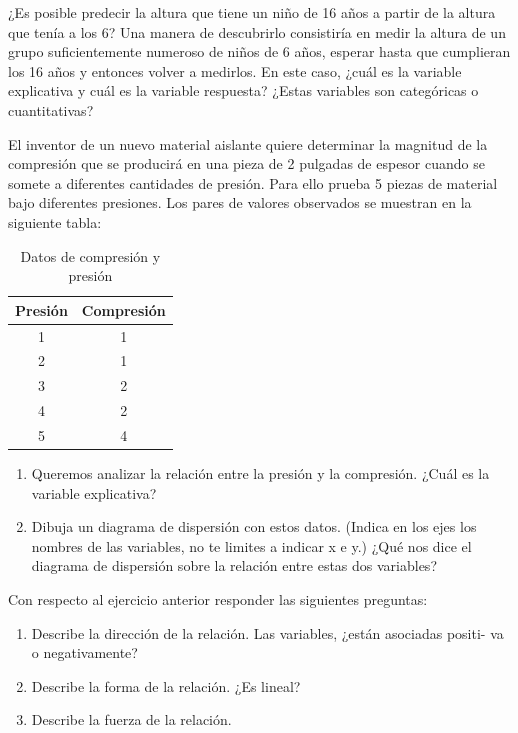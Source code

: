 \documentclass[11pt,evaluacion]{uescimat}
\begin{document}
\begin{problema}
¿Es posible predecir la altura que tiene un niño de 16 años a partir de la altura que tenía a los 6? Una manera de descubrirlo consistiría en medir la altura
de un grupo suficientemente numeroso de niños de 6 años, esperar hasta que
cumplieran los 16 años y entonces volver a medirlos. En este caso, ¿cuál es la variable explicativa y cuál es la variable respuesta? ¿Estas variables son categóricas
o cuantitativas?
\end{problema}

\begin{problema}
El inventor de un nuevo material aislante quiere determinar
la magnitud de la compresión que se producirá en una pieza de 2 pulgadas
de espesor cuando se somete a diferentes cantidades de presión. Para ello
prueba 5 piezas de material bajo diferentes presiones. Los pares de valores
observados se muestran en la siguiente tabla:


\begin{table}[H]
\begin{centering}
\begin{tabular}{|c|c|}
\hline 
Presión & Compresión\tabularnewline
\hline 
\hline 
1 & 1\tabularnewline
\hline 
2 & 1\tabularnewline
\hline 
3 & 2\tabularnewline
\hline 
4 & 2\tabularnewline
\hline 
5 & 4\tabularnewline
\hline 
\end{tabular}
\par\end{centering}
\caption{Datos de compresión y presión}
\end{table}

\begin{enumerate}[label=(\alph*)]
\item Queremos analizar la relación entre la presión y la compresión. ¿Cuál es la variable explicativa?
\item Dibuja un diagrama de dispersión con estos datos. (Indica en los ejes los
nombres de las variables, no te limites a indicar x e y.) ¿Qué nos dice el diagrama
de dispersión sobre la relación entre estas dos variables?
\end{enumerate}


\end{problema}

\begin{problema}
Con respecto al ejercicio anterior responder las siguientes preguntas: 

\begin{enumerate}[label=(\alph*)]
\item Describe la dirección de la relación. Las variables, ¿están asociadas positi-
va o negativamente?

\item Describe la forma de la relación. ¿Es lineal?

\item Describe la fuerza de la relación.


\end{enumerate}



\end{problema}


\end{document}
